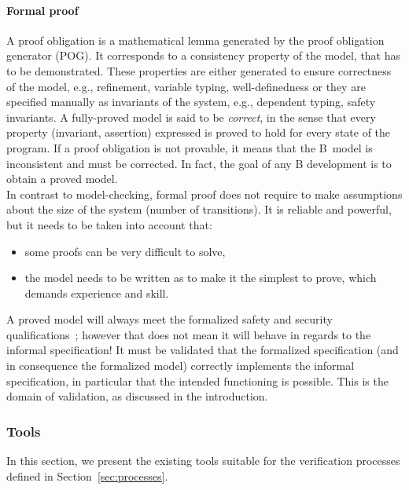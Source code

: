 \paragraph{Formal proof}
A proof obligation is a mathematical lemma generated by the proof obligation
generator (POG). It corresponds to a consistency property of the model, that has
to be demonstrated. These properties are either generated to ensure correctness
of the model, e.g., refinement, variable typing, well-definedness or they are
specified manually as invariants of the system, e.g., dependent typing, safety
invariants. A fully-proved model is said to be \textit{correct}, in the sense
that every property (invariant, assertion) expressed is proved to hold for every
state of the program. If a proof obligation is not provable, it means that the
B~model is inconsistent and must be corrected. In fact, the goal of any B
development is to obtain a proved model.\\
In contrast to model-checking, formal proof does not require to make assumptions
about the size of the system (number of transitions). It is reliable and
powerful, but it needs to be taken into account that:
\begin{itemize}
\item some proofs can be very difficult to solve,
\item the model needs to be written as to make it the simplest to prove, which demands experience and skill.
\end{itemize}
A proved model will always meet the formalized safety and security
qualifications~; however that does not mean it will behave in regards to the
informal specification! It must be validated that the formalized specification
(and in consequence the formalized model) correctly implements the informal
specification, in particular that the intended functioning is possible. This is
the domain of validation, as discussed in the introduction.

\subsubsection{Tools}
\label{sec:tools}

In this section, we present the existing tools suitable for the verification processes defined in Section~\ref{sec:processes}.


